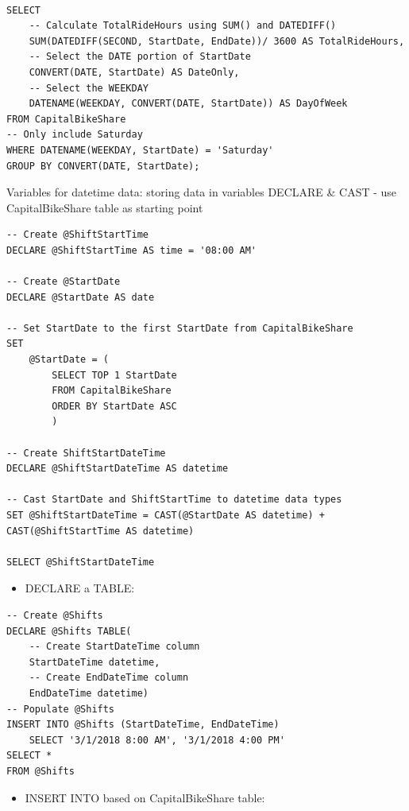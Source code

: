 \documentclass[]{book}
\providecommand{\tightlist}{%
  \setlength{\itemsep}{0pt}\setlength{\parskip}{0pt}}
\begin{document}
\begin{verbatim}

SELECT
	-- Calculate TotalRideHours using SUM() and DATEDIFF()
  	SUM(DATEDIFF(SECOND, StartDate, EndDate))/ 3600 AS TotalRideHours,
    -- Select the DATE portion of StartDate
  	CONVERT(DATE, StartDate) AS DateOnly,
    -- Select the WEEKDAY
  	DATENAME(WEEKDAY, CONVERT(DATE, StartDate)) AS DayOfWeek 
FROM CapitalBikeShare
-- Only include Saturday
WHERE DATENAME(WEEKDAY, StartDate) = 'Saturday' 
GROUP BY CONVERT(DATE, StartDate);
\end{verbatim}

Variables for datetime data: storing data in variables
DECLARE \& CAST
- use CapitalBikeShare table as starting point

\begin{verbatim}
-- Create @ShiftStartTime
DECLARE @ShiftStartTime AS time = '08:00 AM'

-- Create @StartDate
DECLARE @StartDate AS date

-- Set StartDate to the first StartDate from CapitalBikeShare
SET 
	@StartDate = (
    	SELECT TOP 1 StartDate 
    	FROM CapitalBikeShare 
    	ORDER BY StartDate ASC
		)

-- Create ShiftStartDateTime
DECLARE @ShiftStartDateTime AS datetime

-- Cast StartDate and ShiftStartTime to datetime data types
SET @ShiftStartDateTime = CAST(@StartDate AS datetime) + CAST(@ShiftStartTime AS datetime) 

SELECT @ShiftStartDateTime
\end{verbatim}

\begin{itemize}
\tightlist
\item
  DECLARE a TABLE:
\end{itemize}

\begin{verbatim}
-- Create @Shifts
DECLARE @Shifts TABLE(
    -- Create StartDateTime column
	StartDateTime datetime,
    -- Create EndDateTime column
	EndDateTime datetime)
-- Populate @Shifts
INSERT INTO @Shifts (StartDateTime, EndDateTime)
	SELECT '3/1/2018 8:00 AM', '3/1/2018 4:00 PM' 
SELECT * 
FROM @Shifts
\end{verbatim}

\begin{itemize}
\tightlist
\item
  INSERT INTO \citet{TABLE} based on CapitalBikeShare table:
\end{itemize}
\end{document}
